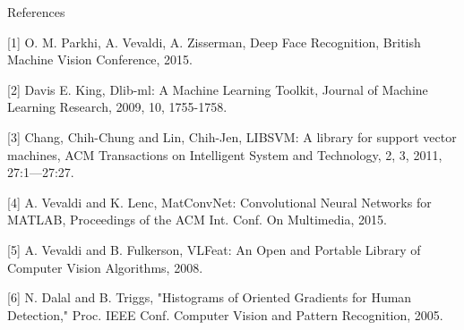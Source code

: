 \begin{tframe}{References}

[1] O. M. Parkhi, A. Vevaldi, A. Zisserman, Deep Face Recognition, British Machine Vision Conference, 2015.

\vspace{0.1in}

[2] Davis E. King, Dlib-ml: A Machine Learning Toolkit, Journal of Machine Learning Research, 2009, 10, 1755-1758.

\vspace{0.1in}

[3] Chang, Chih-Chung and Lin, Chih-Jen, LIBSVM: A library for support vector machines, ACM Transactions on Intelligent System and Technology, 2, 3, 2011, 27:1—27:27.

\vspace{0.1in}

[4] A. Vevaldi and K. Lenc, MatConvNet: Convolutional Neural Networks for MATLAB, Proceedings of the ACM Int. Conf. On Multimedia, 2015.

\vspace{0.1in}

[5] A. Vevaldi and B. Fulkerson, VLFeat: An Open and Portable Library of Computer Vision Algorithms, 2008.

\vspace{0.1in}

[6] N. Dalal and B. Triggs, "Histograms of Oriented Gradients for Human Detection," Proc. IEEE Conf. Computer Vision and Pattern Recognition, 2005. 


\end{tframe}